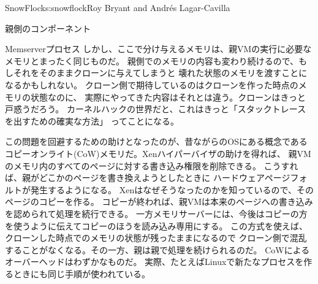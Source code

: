 \begin{aosachapter}{SnowFlock}{s:snowflock}{Roy Bryant and Andr\'e{s} Lagar-Cavilla}
\begin{aosasect1}{親側のコンポーネント}
\begin{aosasect2}{Memserverプロセス}
しかし、ここで分け与えるメモリは、親VMの実行に必要なメモリとまったく同じものだ。
親側でのメモリの内容も変わり続けるので、もしそれをそのままクローンに与えてしまうと
壊れた状態のメモリを渡すことになるかもしれない。
クローン側で期待しているのはクローンを作った時点のメモリの状態なのに、
実際にやってきた内容はそれとは違う。クローンはきっと戸惑うだろう。
カーネルハックの世界だと、これはきっと「スタックトレースを出すための確実な方法」
ってことになる。

この問題を回避するための助けとなったのが、昔ながらのOSにある概念である
コピーオンライト(CoW)メモリだ。Xenハイパーバイザの助けを得れば、
親VMのメモリ内のすべてのページに対する書き込み権限を削除できる。
こうすれば、親がどこかのページを書き換えようとしたときに
ハードウェアページフォルトが発生するようになる。
Xenはなぜそうなったのかを知っているので、そのページのコピーを作る。
コピーが終われば、親VMは本来のページへの書き込みを認められて処理を続行できる。
一方メモリサーバーには、今後はコピーの方を使うように伝えてコピーのほうを読み込み専用にする。
この方式を使えば、クローンした時点でのメモリの状態が残ったままになるので
クローン側で混乱することがなくなる。その一方、親は親で処理を続けられるのだ。
CoWによるオーバーヘッドはわずかなものだ。
実際、たとえばLinuxで新たなプロセスを作るときにも同じ手順が使われている。

\end{aosasect2}


\end{aosasect1}
\end{aosachapter}
